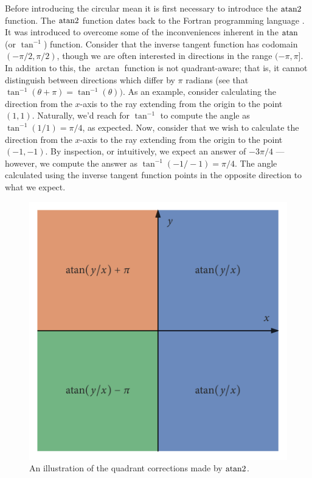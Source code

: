 Before introducing the circular mean it is first necessary to introduce the $\operatorname{atan2}$
function. The $\operatorname{atan2}$ function dates back to the Fortran programming language
\parencite{organick66}. It was introduced to overcome some of the inconveniences inherent
in the $\atan$ (or $\tan^{-1}$) function. Consider that the inverse tangent function has
codomain $(-\pi/2, \pi/2)$, though we are often interested in directions in the range
$(-\pi, \pi]$. In addition to this, the $\arctan$ function is not quadrant-aware; that is,
it cannot distinguish between directions which differ by $\pi$ radians (see that
$\tan^{-1}(\theta + \pi) = \tan^{-1}(\theta))$.  As an example,
consider calculating the direction from the $x$-axis to the ray extending from the origin
to the point $(1, 1)$. Naturally, we'd reach for $\tan^{-1}$ to compute the angle as
$\tan^{-1}(1/1) = \pi/4$, as expected. Now, consider that we wish to calculate the
direction from the $x$-axis to the ray extending from the origin to the point $(-1, -1)$.
By inspection, or intuitively, we expect an answer of $-3\pi/4$ --- however, we compute
the answer as $\tan^{-1}(-1/-1) = \pi/4$. The angle calculated using the inverse tangent
function points in the opposite direction to what we expect.

\begin{figure}[tb]
	\includegraphics{atan_quadrants.pdf}
	\caption{An illustration of the quadrant corrections made by $\operatorname{atan2}$.}
	\label{fig:atan_quadrants}
\end{figure}

